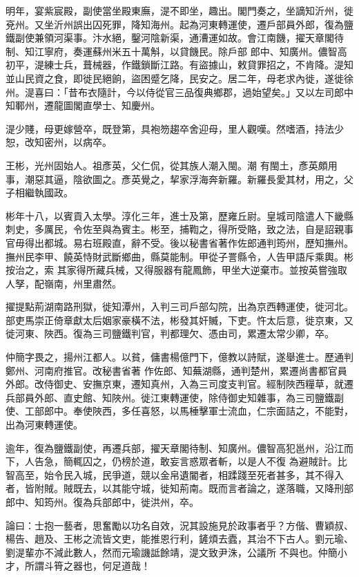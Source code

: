 \begin{pinyinscope}
 明年，宴紫宸殿，副使當坐殿東廡，湜不即坐，趣出。閣門奏之，坐謫知沂州，徙兗州。又坐沂州誤出囚死罪，降知海州。起為河東轉運使，遷戶部員外郎，復為鹽鐵副使兼領河渠事。汴水絕，鑿河陰新渠，通漕運如故。會江南饑，擢天章閣待制、知江寧府，奏運蘇州米五十萬斛，以貸饑民。除戶部
 郎中、知廣州。儂智高初平，湜練士兵，葺械器，作鐵鎖斷江路。有盜據山，敕貸罪招之，不肯降。湜知並山民資之食，即徙民絕餉，盜困蹙乞降，民安之。居二年，母老求內徙，遂徙徐州。湜喜曰：「昔布衣隨計，今以侍從官三品復典鄉郡，過始望矣。」又以左司郎中知鄆州，遷龍圖閣直學士、知慶州。



 湜少賤，母更嫁營卒，既登第，具袍笏趨卒舍迎母，里人觀嘆。然嗜酒，持法少恕，改知密州，以病卒。



 王彬，光州固始人。祖彥英，父仁侃，從其族人潮入閩。潮
 有閩土，彥英頗用事，潮惡其逼，陰欲圖之。彥英覺之，挈家浮海奔新羅。新羅長愛其材，用之，父子相繼執國政。



 彬年十八，以賓貢入太學。淳化三年，進士及第，歷雍丘尉。皇城司陰遣人下畿縣刺史，多厲民，令佐至與為賓主。彬至，捕鞫之，得所受賂，致之法，自是詔親事官毋得出都城。易右班殿直，辭不受。後以秘書省著作佐郎通判筠州，歷知撫州。撫州民李甲、饒英恃財武斷鄉曲，縣莫能制。甲從子詈縣令，人告甲語斥乘輿。彬按治之，索
 其家得所藏兵械，又得服器有龍鳳飾，甲坐大逆棄市。並按英嘗強取人孥，配嶺南，州里肅然。



 擢提點荊湖南路刑獄，徙知潭州，入判三司戶部勾院，出為京西轉運使，徙河北。部吏馬崇正倚章獻太后姻家豪橫不法，彬發其奸贓，下吏。忤太后意，徙京東，又徙河東、陜西。復為三司鹽鐵判官，判都理欠、憑由司，累遷太常少卿，卒。



 仲簡字畏之，揚州江都人。以貧，傭書楊億門下，億教以詩賦，遂舉進士。歷通判鄭州、河南府推官。改秘書省著
 作佐郎、知蕪湖縣，通判楚州，累遷尚書都官員外郎。改侍御史、安撫京東，遷知真州，入為三司度支判官。經制陜西糧草，就遷兵部員外郎、直史館、知陜州。徙江東轉運使，除侍御史知雜事，為三司鹽鐵副使、工部郎中。奉使陜西，多任喜怒，以馬棰擊軍士流血，仁宗面詰之，不能對，出為河東轉運使。



 逾年，復為鹽鐵副使，再遷兵部，擢天章閣待制、知廣州。儂智高犯邕州，沿江而下，人告急，簡輒囚之，仍榜於道，敢妄言惑眾者斬，以是人不復
 為避賊計。比智高至，始令民入城，民爭道，競以金帛遺閽者，相蹂踐至死者甚多，其不得入者，皆附賊。賊既去，以其能守城，徙知荊南。既而言者論之，遂落職，又降刑部郎中、知筠州。復為兵部郎中，徙洪州，卒。



 論曰：士抱一藝者，思奮勵以功名自效，況其設施見於政事者乎？方偕、曹穎叔、楊告、趙及、王彬之流皆文吏，能推恩行利，鏟煩去蠹，其治不下古人。劉元瑜、劉湜輩亦不減此數人，然而元瑜譏詆餘靖，湜文致尹洙，公議所
 不與也。仲簡小才，所謂斗筲之器也，何足道哉！



\end{pinyinscope}